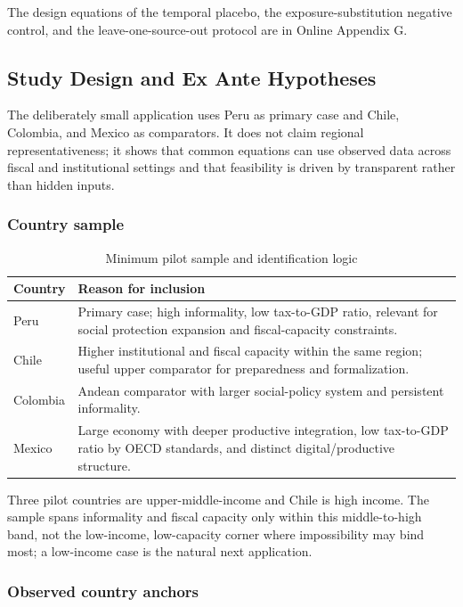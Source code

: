 \documentclass[11pt,a4paper]{article}
\begin{document}
The design equations of the temporal placebo, the exposure-substitution negative control, and the leave-one-source-out protocol are in Online Appendix G.

\subsection{Study Design and Ex Ante Hypotheses}\label{sec:empirical_design}

The deliberately small application uses Peru as primary case and Chile, Colombia, and Mexico as comparators. It does not claim regional representativeness; it shows that common equations can use observed data across fiscal and institutional settings and that feasibility is driven by transparent rather than hidden inputs.

\subsubsection{Country sample}

\begin{table}[H]
\centering
\caption{Minimum pilot sample and identification logic}
\label{tab:pilot_country_logic}
\small
\begin{tabular}{p{}p{}}
\toprule
Country & Reason for inclusion \\
\midrule
Peru & Primary case; high informality, low tax-to-GDP ratio, relevant for social protection expansion and fiscal-capacity constraints. \\
Chile & Higher institutional and fiscal capacity within the same region; useful upper comparator for preparedness and formalization. \\
Colombia & Andean comparator with larger social-policy system and persistent informality. \\
Mexico & Large economy with deeper productive integration, low tax-to-GDP ratio by OECD standards, and distinct digital/productive structure. \\
\bottomrule
\end{tabular}
\end{table}

Three pilot countries are upper-middle-income and Chile is high income. The sample spans informality and fiscal capacity only within this middle-to-high band, not the low-income, low-capacity corner where impossibility may bind most; a low-income case is the natural next application.

\subsubsection{Observed country anchors}
\end{document}
